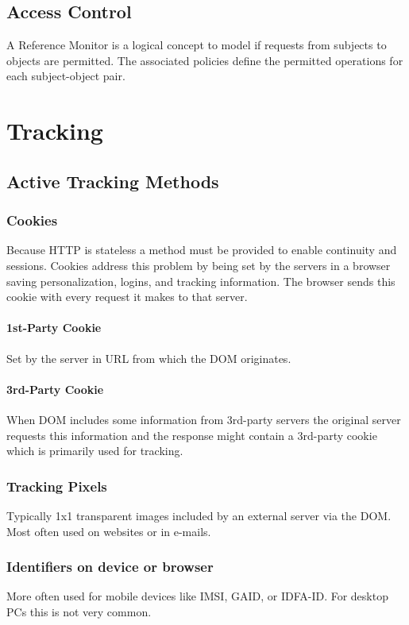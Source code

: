 \documentclass{report}
\begin{document}
	\section{Access Control}
	\startsection
		A Reference Monitor is a logical concept to model if requests from subjects to objects are permitted. The associated policies define the permitted operations for each subject-object pair.
	\closesection
	
	\chapter{Tracking}
	\section{Active Tracking Methods}
	\startsection
		\subsection{Cookies}
		\startsubsection
			Because HTTP is stateless a method must be provided to enable continuity and sessions. Cookies address this problem by being set by the servers in a browser saving personalization, logins, and tracking information. The browser sends this cookie with every request it makes to that server.
			\subsubsection{1st-Party Cookie}
			\startsubsection
				Set by the server in URL from which the DOM originates.
			\closesection
			\subsubsection{3rd-Party Cookie}
			\startsubsection
				When DOM includes some information from 3rd-party servers the original server requests this information and the response might contain a 3rd-party cookie which is primarily used for tracking.
			\closesection
		\closesection
		\subsection{Tracking Pixels}
		\startsubsection
			Typically 1x1 transparent images included by an external server via the DOM. Most often used on websites or in e-mails.
		\closesection
		\subsection{Identifiers on device or browser}
		\startsubsection
			More often used for mobile devices like IMSI, GAID, or IDFA-ID. For desktop PCs this is not very common.
		\closesection
\end{document}
